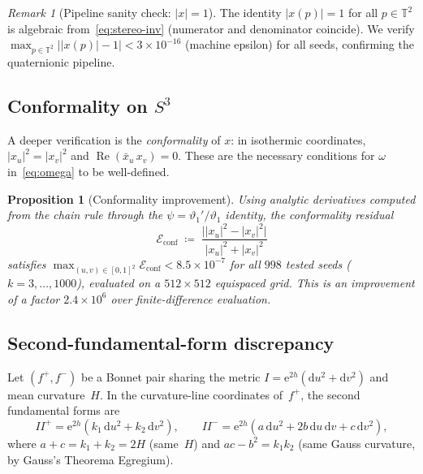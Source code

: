 \documentclass[11pt,a4paper]{article}
\theoremstyle{plain}
\newtheorem{proposition}[theorem]{Proposition}
\theoremstyle{definition}
\theoremstyle{remark}
\newtheorem{remark}[theorem]{Remark}
\DeclareMathOperator{\Real}{Re}
\newcommand{\vt}[1]{\vartheta_{#1}}     %
\newcommand{\T}{\mathbb{T}}             %
\newcommand{\dd}{\mathrm{d}}
\newcommand{\ee}{\mathrm{e}}
\newcommand{\abs}[1]{\lvert #1 \rvert}
\begin{document}
\begin{remark}[Pipeline sanity check: $\abs{x} = 1$]
\label{obs:unit-x}
  The identity $\abs{x(p)} = 1$ for all $p \in \T^2$ is
  algebraic from~\eqref{eq:stereo-inv} (numerator and
  denominator coincide).  We verify
  $\max_{p \in \T^2} \bigl|\abs{x(p)} - 1\bigr|
  < 3 \times 10^{-16}$ (machine epsilon) for all seeds,
  confirming the quaternionic pipeline.
\end{remark}

\subsection{Conformality on \texorpdfstring{$S^3$}{S³}}\label{sec:conformality}
A deeper verification is the \emph{conformality} of $x$:
in isothermic coordinates, $\abs{x_u}^2 = \abs{x_v}^2$ and
$\Real(\bar{x}_u\,x_v) = 0$.  These are the necessary conditions
for $\omega$ in~\eqref{eq:omega} to be well-defined.

\begin{proposition}[Conformality improvement]
\label{prop:conformality}
Using analytic derivatives computed from the chain rule through
the $\psi = \vt{1}'/\vt{1}$ identity, the conformality residual
\[
  \mathcal{E}_{\mathrm{conf}}
  \;\coloneqq\;  \frac{\bigl|\abs{x_u}^2 - \abs{x_v}^2\bigr|}
    {\abs{x_u}^2 + \abs{x_v}^2}
\]
satisfies
$\max_{(u,v)\in[0,1]^2} \mathcal{E}_{\mathrm{conf}} < 8.5 \times 10^{-7}$
for all $998$ tested seeds ($k = 3,\ldots,1000$), evaluated on a
$512 \times 512$ equispaced grid.  This is an improvement of a factor
$2.4 \times 10^6$ over finite-difference evaluation.
\end{proposition}

\subsection{Second-fundamental-form discrepancy}
\label{sec:DeltaII}

Let $(f^+, f^-)$ be a Bonnet pair sharing the metric
$I = \ee^{2h}(\dd u^2 + \dd v^2)$ and mean curvature~$H$.
In the curvature-line coordinates of~$f^+$, the second
fundamental forms are
\[
  II^+ = \ee^{2h}(k_1\,\dd u^2 + k_2\,\dd v^2), \qquad
  II^- = \ee^{2h}(a\,\dd u^2 + 2b\,\dd u\,\dd v + c\,\dd v^2),
\]
where $a + c = k_1 + k_2 = 2H$ (same~$H$) and
$ac - b^2 = k_1 k_2$ (same Gauss curvature, by
Gauss's Theorema Egregium).
\end{document}
